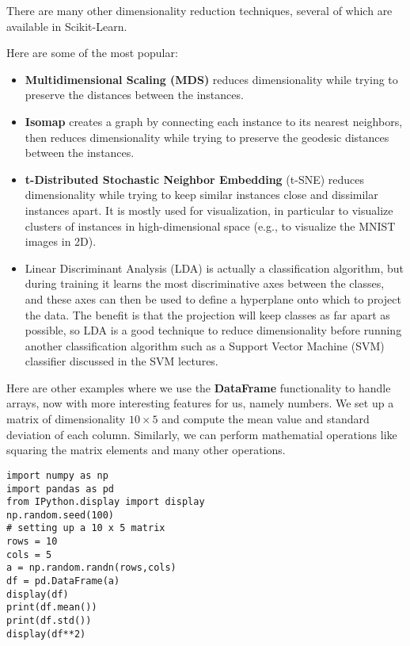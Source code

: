 \documentclass[%
oneside,                 %
final,                   %
10pt]{article}
\begin{document}
There are many other dimensionality reduction techniques, several of which are available in Scikit-Learn.

Here are some of the most popular:
\begin{itemize}
\item \textbf{Multidimensional Scaling (MDS)} reduces dimensionality while trying to preserve the distances between the instances.

\item \textbf{Isomap} creates a graph by connecting each instance to its nearest neighbors, then reduces dimensionality while trying to preserve the geodesic distances between the instances.

\item \textbf{t-Distributed Stochastic Neighbor Embedding} (t-SNE) reduces dimensionality while trying to keep similar instances close and dissimilar instances apart. It is mostly used for visualization, in particular to visualize clusters of instances in high-dimensional space (e.g., to visualize the MNIST images in 2D).

\item Linear Discriminant Analysis (LDA) is actually a classification algorithm, but during training it learns the most discriminative axes between the classes, and these axes can then be used to define a hyperplane onto which to project the data. The benefit is that the projection will keep classes as far apart as possible, so LDA is a good technique to reduce dimensionality before running another classification algorithm such as a Support Vector Machine (SVM) classifier discussed in the SVM lectures.
\end{itemize}

\noindent
Here are other examples where we use the \textbf{DataFrame} functionality to handle arrays, now with more interesting features for us, namely numbers. We set up a matrix 
of dimensionality $10\times 5$ and compute the mean value and standard deviation of each column. Similarly, we can perform mathematial operations like squaring the matrix elements and many other operations. 
\begin{verbatim}
import numpy as np
import pandas as pd
from IPython.display import display
np.random.seed(100)
# setting up a 10 x 5 matrix
rows = 10
cols = 5
a = np.random.randn(rows,cols)
df = pd.DataFrame(a)
display(df)
print(df.mean())
print(df.std())
display(df**2)
\end{verbatim}
\end{document}
